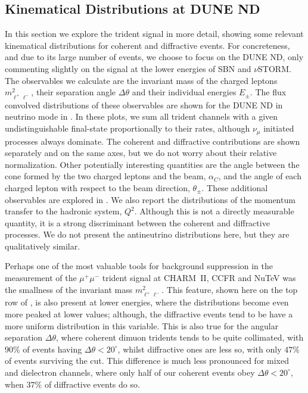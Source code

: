 %
\subsection{Kinematical Distributions at DUNE ND}
%
\label{subsec:kine}

In this section we explore the trident signal in more detail, showing some relevant kinematical distributions for coherent and diffractive events. For concreteness, and due to its large number of events, we choose to focus on the DUNE ND, only commenting slightly on the signal at the lower energies of SBN and $\nu$STORM. The observables we calculate are the invariant mass of the charged leptons $m^2_{\ell^+ \ell^-}$, their separation angle $\Delta \theta$ and their individual energies $E_\pm$. The flux convolved distributions of these observables are shown for the DUNE ND in neutrino mode in . In these plots, we sum all trident channels with a given undistinguishable final-state proportionally to their rates, although $\nu_\mu$ initiated processes always dominate. The coherent and diffractive contributions are shown separately and on the same axes, but we do not worry about their relative normalization. Other potentially interesting quantities are the angle between the cone formed by the two charged leptons and the beam, $\alpha_C$, and the angle of each charged lepton with respect to the beam direction, $\theta_\pm$.  These additional observables are explored in . We also report the distributions of the momentum transfer to the hadronic system, $Q^2$. Although this is not a directly measurable quantity, it is a strong discriminant between the coherent and diffractive processes. We do not present the antineutrino distributions here, but they are qualitatively similar.

Perhaps one of the most valuable tools for background suppression in the measurement of the $\mu^+\mu^-$ trident signal at CHARM~II, CCFR and NuTeV \cite{Geiregat:1990gz,Mishra:1991bv,Adams:1998yf} was the smallness of the invariant mass $m^2_{\ell^+ \ell^-}$. This feature, shown here on the top row of , is also present at lower energies, where the distributions become even more peaked at lower values; although, the diffractive events tend to be have a more uniform distribution in this variable. This is also true for the angular separation $\Delta \theta$, where coherent dimuon tridents tends to be quite collimated, with $90\%$ of events having $\Delta \theta < 20^\circ$, whilst diffractive ones are less so, with only $47\%$ of events surviving the cut. This difference is much less pronounced for mixed and dielectron channels, where only half of our coherent events obey $\Delta \theta < 20^\circ$, when $37\%$ of diffractive events do so.

